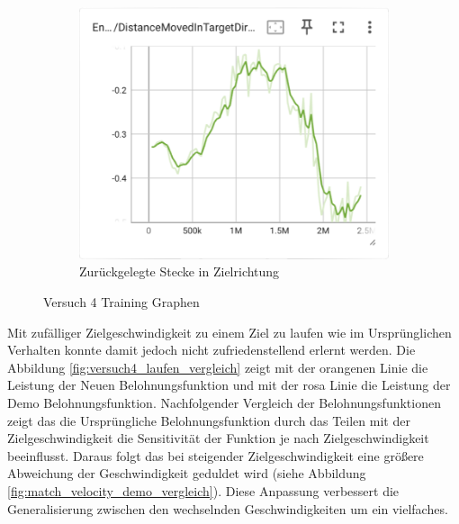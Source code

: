\begin{figure}[H]
    \begin{subfigure}{.49\textwidth}
      \centering  
      \includegraphics[width=\textwidth]{img/126_move_target_dir}
      \caption{Zurückgelegte Stecke in Zielrichtung}
      \label{fig:126_move_target_dir}
    \end{subfigure}
  \caption{Versuch 4 Training Graphen}
  \label{fig:versuch4_training}
\end{figure}

Mit zufälliger Zielgeschwindigkeit zu einem Ziel zu laufen wie im Ursprünglichen Verhalten konnte damit jedoch nicht zufriedenstellend erlernt werden. Die Abbildung \ref{fig:versuch4_laufen_vergleich} zeigt mit der orangenen Linie die Leistung der Neuen Belohnungsfunktion und mit der rosa Linie die Leistung der Demo Belohnungsfunktion. Nachfolgender Vergleich der Belohnungsfunktionen zeigt das die Ursprüngliche Belohnungsfunktion durch das Teilen mit der Zielgeschwindigkeit die Sensitivität der Funktion je nach Zielgeschwindigkeit beeinflusst. Daraus folgt das bei steigender Zielgeschwindigkeit eine größere Abweichung der Geschwindigkeit geduldet wird (siehe Abbildung \ref{fig:match_velocity_demo_vergleich}). Diese Anpassung verbessert die Generalisierung zwischen den wechselnden Geschwindigkeiten um ein vielfaches.


